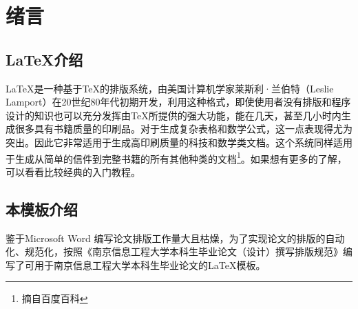 
\section{绪言}

\subsection{\LaTeX 介绍}

\LaTeX 是一种基于\TeX 的排版系统，由美国计算机学家莱斯利·兰伯特（Leslie Lamport）在20世纪80年代初期开发，利用这种格式，即使使用者没有排版和程序设计的知识也可以充分发挥由\TeX 所提供的强大功能，能在几天，甚至几小时内生成很多具有书籍质量的印刷品。对于生成复杂表格和数学公式，这一点表现得尤为突出。因此它非常适用于生成高印刷质量的科技和数学类文档。这个系统同样适用于生成从简单的信件到完整书籍的所有其他种类的文档\footnote{摘自百度百科}。如果想有更多的了解，可以看看比较经典的入门教程\cite{x1}。

\subsection{本模板介绍}

鉴于Microsoft Word 编写论文排版工作量大且枯燥，为了实现论文的排版的自动化、规范化，按照《南京信息工程大学本科生毕业论文（设计）撰写排版规范》编写了可用于南京信息工程大学本科生毕业论文的\LaTeX 模板。